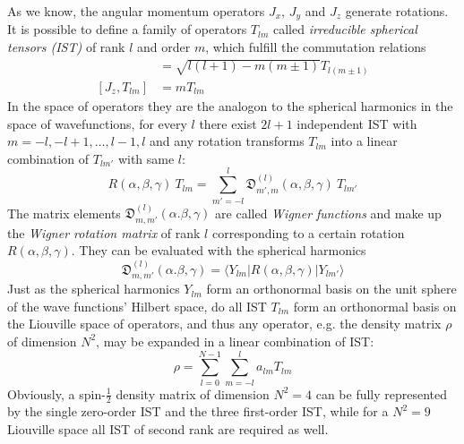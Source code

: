 \documentclass[11.5pt,a4paper]{article}
\begin{document}
As we know, the angular momentum operators $J_x$, $J_y$ and $J_z$ generate rotations. It is possible to define a family of operators $T_{lm}$ called \emph{irreducible spherical tensors (IST)} of rank $l$ and order $m$, which fulfill the commutation relations
\begin{align}
 [J_\pm,T_{lm}] & = \sqrt{l(l+1)-m(m\pm1)} T_{l(m\pm1)} \\
  [J_z, T_{lm}] & = m T_{lm}
  \label{eq-tlm-commutators}
\end{align}
In the space of operators they are the analogon to the spherical harmonics in the space of wavefunctions, for every $l$ there exist $2l+1$ independent IST with $m = -l, -l+1, \dots , l-1, l$ and any rotation transforms $T_{lm}$ into a linear combination of $T_{lm'}$ with same $l$:
\begin{equation}
 R(\alpha,\beta,\gamma) \ T_{lm} = \sum_{m'=-l}^l \mathfrak{D}_{m',m}^{(l)}(\alpha,\beta,\gamma) \ T_{lm'}
  \label{eq-wigner-rotation}
\end{equation}
The matrix elements $\mathfrak{D}_{m,m'}^{(l)}(\alpha.\beta,\gamma)$ are called \emph{Wigner functions} and make up the \emph{Wigner rotation matrix} of rank $l$ corresponding to a certain rotation $R(\alpha,\beta,\gamma)$. They can be evaluated with the spherical harmonics
\begin{equation}
 \mathfrak{D}_{m,m'}^{(l)}(\alpha.\beta,\gamma) = \langle Y_{lm}|R(\alpha,\beta,\gamma)|Y_{lm'} \rangle
\end{equation}
Just as the spherical harmonics $Y_{lm}$ form an orthonormal basis on the unit sphere of the wave functions' Hilbert space, do all IST $T_{lm}$ form an orthonormal basis on the Liouville space of operators, and thus any operator, e.g. the density matrix $\rho$ of dimension $N^2$, may be expanded in a linear combination of IST:
\begin{equation}
 \rho = \sum_{l=0}^{N-1} \sum_{m=-l}^l a_{lm} T_{lm}
\end{equation}
Obviously, a spin-$\tfrac{1}{2}$ density matrix of dimension $N^2=4$ can be fully represented by the single zero-order IST and the three first-order IST, while for a $N^2=9$ Liouville space all IST of second rank are required as well. 
\end{document}
